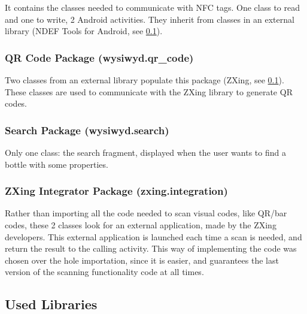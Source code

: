It contains the classes needed to communicate with NFC tags. One class to read and one to write, 2 Android activities. They inherit from classes in an external library (NDEF Tools for Android, see \ref{used_libraries}).

\subsubsection{QR Code Package (wysiwyd.qr\_code)}

Two classes from an external library populate this package (ZXing, see \ref{used_libraries}). These classes are used to communicate with the ZXing library to generate QR codes.

\subsubsection{Search Package (wysiwyd.search)}

Only one class: the search fragment, displayed when the user wants to find a bottle with some properties.

\subsubsection{ZXing Integrator Package (zxing.integration)}

Rather than importing all the code needed to scan visual codes, like QR/bar codes, these 2 classes look for an external application, made by the ZXing developers. This external application is launched each time a scan is needed, and return the result to the calling activity. This way of implementing the code was chosen over the hole importation, since it is easier, and guarantees the last version of the scanning functionality code at all times.

\subsection{Used Libraries}
\label{used_libraries}

